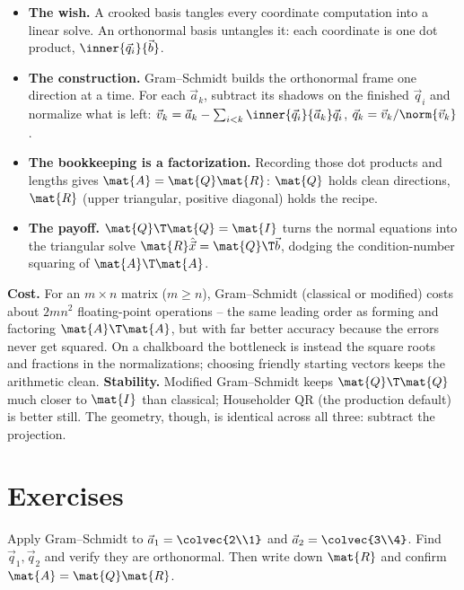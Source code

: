 \begin{itemize}
  \item \textbf{The wish.} A crooked basis tangles every coordinate computation into a
        linear solve. An orthonormal basis untangles it: each coordinate is one dot
        product, $\inner{\vec{q}_i}{\vec{b}}$.
  \item \textbf{The construction.} Gram--Schmidt builds the orthonormal frame one
        direction at a time. For each $\vec{a}_k$, subtract its shadows on the finished
        $\vec{q}_i$ and normalize what is left:
        $\vec{v}_k=\vec{a}_k-\sum_{i<k}\inner{\vec{q}_i}{\vec{a}_k}\vec{q}_i$,
        $\vec{q}_k=\vec{v}_k/\norm{\vec{v}_k}$.
  \item \textbf{The bookkeeping is a factorization.} Recording those dot products and
        lengths gives $\mat{A}=\mat{Q}\mat{R}$: $\mat{Q}$ holds clean directions,
        $\mat{R}$ (upper triangular, positive diagonal) holds the recipe.
  \item \textbf{The payoff.} $\mat{Q}\T\mat{Q}=\mat{I}$ turns the normal equations into
        the triangular solve $\mat{R}\hat{\vec{x}}=\mat{Q}\T\vec{b}$, dodging the
        condition-number squaring of $\mat{A}\T\mat{A}$.
\end{itemize}

\textbf{Cost.} For an $m\times n$ matrix ($m\ge n$), Gram--Schmidt (classical or
modified) costs about $2mn^2$ floating-point operations -- the same leading order as
forming and factoring $\mat{A}\T\mat{A}$, but with far better accuracy because the
errors never get squared. On a chalkboard the bottleneck is instead the square roots and
fractions in the normalizations; choosing friendly starting vectors keeps the arithmetic
clean. \textbf{Stability.} Modified Gram--Schmidt keeps $\mat{Q}\T\mat{Q}$ much closer to
$\mat{I}$ than classical; Householder QR (the production default) is better still. The
geometry, though, is identical across all three: subtract the projection.

\section{Exercises}

\begin{exercise}
Apply Gram--Schmidt to $\vec{a}_1=\colvec{2\\1}$ and $\vec{a}_2=\colvec{3\\4}$. Find
$\vec{q}_1,\vec{q}_2$ and verify they are orthonormal. Then write down $\mat{R}$ and
confirm $\mat{A}=\mat{Q}\mat{R}$.
\end{exercise}

